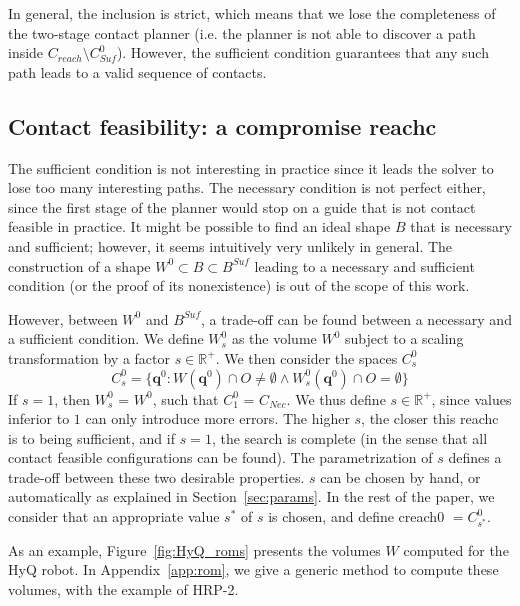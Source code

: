 In general, the inclusion is strict, which means that we lose the completeness of the two-stage contact planner (i.e. the planner is not able to discover a path inside \mbox{$C_{reach} \setminus C_{Suf}^0$}). However, the sufficient condition guarantees that any such path leads to a valid sequence of contacts.

\subsection{Contact feasibility: a compromise \gls{reachc}}
The sufficient condition is not interesting in practice since it leads the solver to lose too many interesting paths. The necessary condition is not perfect either, since the first stage of the planner would stop on a guide that is not \gls{contact feasible} in practice. It might be possible to find an ideal shape $B$ that is necessary and sufficient; however, it seems intuitively very unlikely in general. The construction of a shape $W^0 \subset B \subset B^{Suf}$ leading to a necessary and sufficient condition (or the proof of its nonexistence) is out of the scope of this work.

However, between $W^0$ and $B^{Suf}$, a trade-off can be found between a necessary and a sufficient condition. We define $W^0_s$ as the volume $W^0$ subject to a scaling transformation by a factor $s \in \mathbb{R}^+$.
%
We then consider the spaces $C_{s}^0$
 \begin{equation}
C^0_s = \{ \mathbf{q}^0 : W(\mathbf{q}^{0}) \cap O \neq \emptyset \wedge W^0_s(\mathbf{q}^{0}) \cap O = \emptyset \} %
\end{equation}
%
If $s=1$, then $W^0_s$ = $W^0$, such that $C_1^0$ = $C_{Nec}$. We thus define $s \in \mathbb{R}^+$, since values inferior to $1$ can only introduce more errors.
The higher $s$, the closer this \gls{reachc} is to being sufficient, and if $s=1$, the search is complete (in the sense that all \gls{contact feasible} configurations can be found). The parametrization of $s$ defines a trade-off between these two desirable properties. $s$ can be chosen by hand, or automatically as explained in Section~\ref{sec:params}.
In the rest of the paper, we consider that an appropriate value $s^*$ of $s$ is chosen, and define \gls{creach0} $= C^0_{s^*}$.

As an example, Figure~\ref{fig:HyQ_roms} presents the volumes $W$ computed for the HyQ robot.
In Appendix~\ref{app:rom}, we give a generic method to compute these volumes, with the example of HRP-2.

